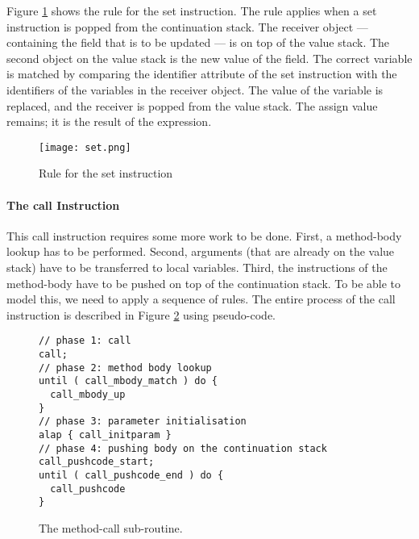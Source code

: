 
Figure \ref{fig:set} shows the rule for the {\sc set} instruction. The rule applies when a {\sc set} instruction is popped from the continuation stack. The receiver object --- containing the field that is to be updated --- is on top of the value stack. The second object on the value stack is the new value of the field. The correct variable  is matched by comparing the identifier attribute of the {\sc set} instruction with the identifiers of the variables in the receiver object. The value of the variable is replaced, and the receiver is popped from the value stack. The assign value remains; it is the result of the expression.

\begin{figure}
	\begin{center}
		\texttt{[image: set.png]}
	\end{center}
		\caption{Rule for the {\sc set} instruction}
	\label{fig:set}
\end{figure}

\paragraph{The {\sc call} Instruction}

This {\sc call} instruction requires some more work to be done. First, a method-body lookup has to be performed. Second, arguments (that are already on the value stack) have to be transferred to local variables. Third, the instructions of the method-body have to be pushed on top of the continuation stack. To be able to model this, we need to apply a sequence of rules. The entire process of the {\sc call} instruction is described in Figure \ref{lst:call} using pseudo-code.

\begin{figure}[ht]
\begin{lstlisting}[language=Control]
// phase 1: call
call;
// phase 2: method body lookup
until ( call_mbody_match ) do {
  call_mbody_up
}
// phase 3: parameter initialisation
alap { call_initparam }
// phase 4: pushing body on the continuation stack
call_pushcode_start;
until ( call_pushcode_end ) do {
  call_pushcode
}
\end{lstlisting}
\caption{The method-call sub-routine.}
\label{lst:call}
\end{figure}

